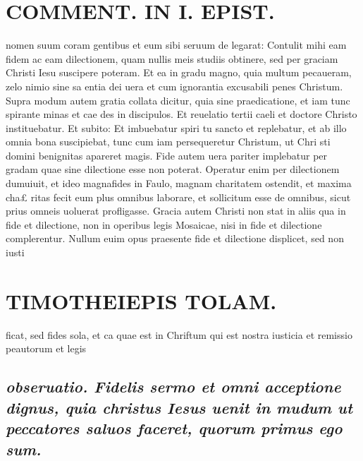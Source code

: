 \documentclass{article}
\begin{document}
\begin{pages}
\section*{COMMENT. IN I. EPIST. }
\marginpar{[ p.30 ]}\pstart nomen suum coram gentibus et eum sibi seruum de legarat: Contulit mihi eam fidem ac eam dilectionem, quam nullis meis studiis obtinere, sed per graciam Christi Iesu suscipere poteram. Et ea in gradu magno, quia multum pecaueram, zelo nimio sine sa entia dei uera et cum ignorantia excusabili penes Christum.  \pend\pstart Supra modum autem gratia collata dicitur, quia sine praedicatione, et iam tunc spirante minas et cae des in discipulos. Et reuelatio tertii caeli et doctore Christo instituebatur. Et subito: Et imbuebatur spiri tu sancto et replebatur, et ab illo omnia bona suscipiebat, tunc cum iam persequeretur Christum, ut Chri sti domini benignitas apareret magis.  \pend\pstart Fide autem uera pariter implebatur per gradam quae sine dilectione esse non poterat. Operatur enim per dilectionem dumuiuit, et ideo magnafides in Faulo, magnam charitatem ostendit, et maxima cha£ ritas fecit eum plus omnibus laborare, et sollicitum esse de omnibus, sicut prius omneis uoluerat profligasse.  \pend\pstart Gracia autem Christi non stat in aliis qua in fide et dilectione, non in operibus legis Mosaicae, nisi in fide et dilectione complerentur. Nullum euim opus praesente fide et dilectione displicet, sed non iusti\pend
\section*{TIMOTHEIEPIS TOLAM. }
\marginpar{[ p.31 ]}\pstart ficat, sed fides sola, et ca quae est in Chriftum qui est nostra iusticia et remissio peautorum et legis  \pend
{}
{}
\subsection*{\textit{obseruatio. Fidelis sermo et omni acceptione dignus, quia christus Iesus uenit in mudum ut peccatores saluos faceret, quorum primus ego sum. }}
{}

\end{pages}
\end{document}
